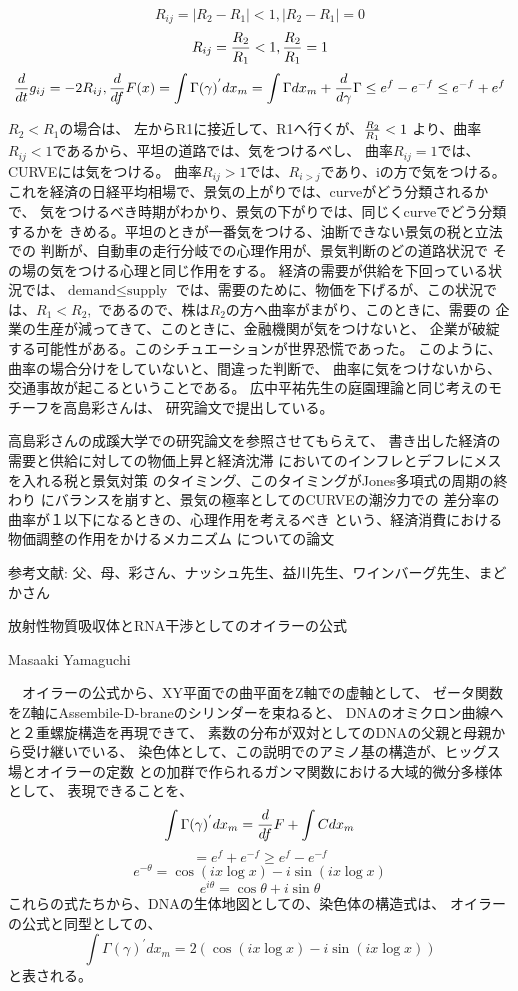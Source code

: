 \documentclass{jsarticle}
\begin{document}
{  $$ R_{ij} = |R_2 - R_1| < 1, |R_2 - R_1| = 0 $$
  $$ R_{ij} = {R_2 \over R_1} < 1, {R_2 \over R_1} = 1 $$
  $$ {d \over dt}g_{ij} = - 2 R_{ij}, {d \over d f} F(x) = 
  \int \Gamma(\gamma)^{'}dx_m = \int \Gamma dx_m + {d \over d \gamma}
  \Gamma \le e^{f} - e^{-f} \le e^{-f} + e^{f} $$


$ R_2 < R_1 \text{の場合は、}$
左からR1に接近して、R1へ行くが、${R_2 \over R_1} < 1 $
より、曲率$R_{ij} < 1$であるから、平坦の道路では、気をつけるべし、
曲率$R_{ij} = 1$では、CURVEには気をつける。
曲率$R_{ij} > 1$では、$R_{i > j}$であり、iの方で気をつける。
これを経済の日経平均相場で、景気の上がりでは、curveがどう分類されるかで、
気をつけるべき時期がわかり、景気の下がりでは、同じくcurveでどう分類するかを
きめる。平坦のときが一番気をつける、油断できない景気の税と立法での
判断が、自動車の走行分岐での心理作用が、景気判断のどの道路状況で
その場の気をつける心理と同じ作用をする。
経済の需要が供給を下回っている状況では、$\text{demand} \le \text{supply}$
では、需要のために、物価を下げるが、この状況では、$ R_1 < R_2, $
であるので、株は$R_2$の方へ曲率がまがり、このときに、需要の
企業の生産が減ってきて、このときに、金融機関が気をつけないと、
企業が破綻する可能性がある。このシチュエーションが世界恐慌であった。
このように、曲率の場合分けをしていないと、間違った判断で、
曲率に気をつけないから、交通事故が起こるということである。
広中平祐先生の庭園理論と同じ考えのモチーフを高島彩さんは、
研究論文で提出している。

   高島彩さんの成蹊大学での研究論文を参照させてもらえて、
書き出した経済の需要と供給に対しての物価上昇と経済沈滞
においてのインフレとデフレにメスを入れる税と景気対策
のタイミング、このタイミングがJones多項式の周期の終わり
にバランスを崩すと、景気の極率としてのCURVEの潮汐力での
差分率の曲率が１以下になるときの、心理作用を考えるべき
という、経済消費における物価調整の作用をかけるメカニズム
についての論文 　

参考文献: 父、母、彩さん、ナッシュ先生、益川先生、ワインバーグ先生、まどかさん


\newpage
\begin{center}
\large	放射性物質吸収体とRNA干渉としてのオイラーの公式
\end{center}
\begin{center}
	Masaaki Yamaguchi
\end{center}

  　オイラーの公式から、XY平面での曲平面をZ軸での虚軸として、
  ゼータ関数をZ軸にAssembile-D-braneのシリンダーを束ねると、
  DNAのオミクロン曲線へと２重螺旋構造を再現できて、
  素数の分布が双対としてのDNAの父親と母親から受け継いでいる、
  染色体として、この説明でのアミノ基の構造が、ヒッグス場とオイラーの定数
  との加群で作られるガンマ関数における大域的微分多様体として、
  表現できることを、
  $$ \int \Gamma(\gamma)^{'}dx_m = {d \over df}F + \int C dx_m $$
  $$ = e^f + e^{-f} \ge e^{f} - e^{-f} $$
  $$ e^{-\theta} = \cos(i x \log x) - i \sin(i x \log x) $$
  $$ e^{i \theta} = \cos \theta + i \sin \theta $$
  これらの式たちから、DNAの生体地図としての、染色体の構造式は、
  オイラーの公式と同型としての、
  $$ \int \Gamma(\gamma)^{'}dx_m  = 2(\cos (i x \log x) - i \sin (i x \log x))$$
  と表される。

}
\end{document}
